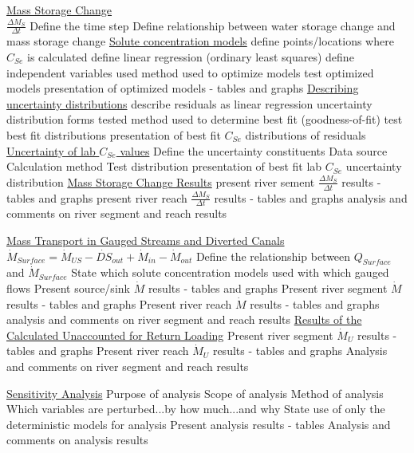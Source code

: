 \documentclass[12pt]{article}
\begin{document}
\begin{outline}[enumerate]
		\2 \underline{Mass Storage Change}\\
			$\frac{\Delta M_S}{\Delta t}$
			\3 Define the time step
			\3 Define relationship between water storage change and mass storage change
			\3 \underline{Solute concentration models}
				\4 define points/locations where $C_{Se}$ is calculated
				\4 define linear regression (ordinary least squares)
				\4 define independent variables used
				\4 method used to optimize models
				\4 test optimized models 
				\4 presentation of optimized models - tables and graphs
			\3 \underline{Describing uncertainty distributions}
				\4 describe residuals as linear regression uncertainty
				\4 distribution forms tested
				\4 method used to determine best fit (goodness-of-fit)
				\4 test best fit distributions
				\4 presentation of best fit $C_{Se}$ distributions of residuals
			\3 \underline{Uncertainty of lab $C_{Se}$ values}
				\4 Define the uncertainty constituents
				\4 Data source
				\4 Calculation method
				\4 Test distribution
				\4 presentation of best fit lab $C_{Se}$ uncertainty distribution
			\3 \underline{Mass Storage Change Results}
				\4 present river sement $\frac{\Delta M_S}{\Delta t}$ results - tables and graphs
				\4 present river reach $\frac{\Delta M_S}{\Delta t}$ results - tables and graphs
				\4 analysis and comments on river segment and reach results
			
		\2 \underline{Mass Transport in Gauged Streams and Diverted Canals}\\
			$\dot{M}_{Surface}=\dot{M}_{US}-\dot{DS}_{out}+\dot{M}_{in}-\dot{M}_{out}$
			\3 Define the relationship between $Q_{Surface}$ and $\dot{M}_{Surface}$
			\3 State which solute concentration models used with which gauged flows
			\3 Present source/sink $\dot{M}$ results - tables and graphs
			\3 Present river segment $\dot{M}$ results - tables and graphs
			\3 Present river reach $\dot{M}$ results - tables and graphs
			\3 analysis and comments on river segment and reach results
		\2 \underline{Results of the Calculated Unaccounted for Return Loading}
			\3 Present river segment $\dot{M}_U$ results - tables and graphs
			\3 Present river reach $\dot{M}_U$ results - tables and graphs
			\3 Analysis and comments on river segment and reach results
		
	\1 \underline{Sensitivity Analysis}
		\2 Purpose of analysis
		\2 Scope of analysis
		\2 Method of analysis
			\3 Which variables are perturbed...by how much...and why
			\3 State use of only the deterministic models for analysis
		\2 Present analysis results - tables
		\2 Analysis and comments on analysis results			
			

\end{outline}
\end{document}
